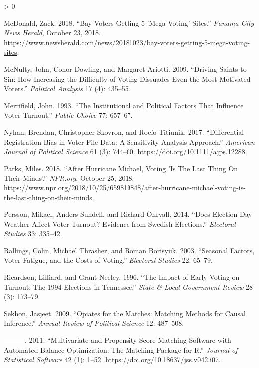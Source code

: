 \documentclass[
  12pt,
]{article}
\newlength{\cslhangindent}
\newenvironment{CSLReferences}[2] %
 {%
  \setlength{\parindent}{0pt}
  \ifodd #1 \everypar{\setlength{\hangindent}{\cslhangindent}}\ignorespaces\fi
  \ifnum #2 > 0
  \setlength{\parskip}{#2\baselineskip}
  \fi
 }%
 {}
\begin{document}
\begin{CSLReferences}{1}{0}
\leavevmode\hypertarget{ref-McDonald2018}{}%
McDonald, Zack. 2018. {``Bay Voters Getting 5 'Mega Voting' Sites.''} \emph{Panama City News Herald}, October 23, 2018. \url{https://www.newsherald.com/news/20181023/bay-voters-getting-5-mega-voting-sites}.

\leavevmode\hypertarget{ref-McNulty2009}{}%
McNulty, John, Conor Dowling, and Margaret Ariotti. 2009. {``Driving {Saints} to {Sin}: {How Increasing} the {Difficulty} of {Voting Dissuades Even} the {Most Motivated Voters}.''} \emph{Political Analysis} 17 (4): 435--55.

\leavevmode\hypertarget{ref-Merrifield1993}{}%
Merrifield, John. 1993. {``The {Institutional} and {Political Factors} That {Influence Voter Turnout}.''} \emph{Public Choice} 77: 657--67.

\leavevmode\hypertarget{ref-Nyhan2017}{}%
Nyhan, Brendan, Christopher Skovron, and Rocío Titiunik. 2017. {``Differential {Registration Bias} in {Voter File Data}: {A Sensitivity Analysis Approach}.''} \emph{American Journal of Political Science} 61 (3): 744--60. \url{https://doi.org/10.1111/ajps.12288}.

\leavevmode\hypertarget{ref-Parks2018}{}%
Parks, Miles. 2018. {``After {Hurricane Michael}, {Voting} '{Is The Last Thing On Their Minds}'.''} \emph{NPR.org}, October 25, 2018. \url{https://www.npr.org/2018/10/25/659819848/after-hurricane-michael-voting-is-the-last-thing-on-their-minds}.

\leavevmode\hypertarget{ref-Persson2014}{}%
Persson, Mikael, Anders Sundell, and Richard Öhrvall. 2014. {``Does {Election Day Weather Affect Voter Turnout}? {Evidence} from {Swedish Elections}.''} \emph{Electoral Studies} 33: 335--42.

\leavevmode\hypertarget{ref-Rallings2003}{}%
Rallings, Colin, Michael Thrasher, and Roman Borisyuk. 2003. {``Seasonal {Factors}, Voter Fatigue, and the Costs of Voting.''} \emph{Electoral Studies} 22: 65--79.

\leavevmode\hypertarget{ref-Ricardson1996}{}%
Ricardson, Lilliard, and Grant Neeley. 1996. {``The {Impact} of {Early Voting} on {Turnout}: {The} 1994 {Elections} in {Tennessee}.''} \emph{State \& Local Government Review} 28 (3): 173--79.

\leavevmode\hypertarget{ref-Sekhon2009}{}%
Sekhon, Jasjeet. 2009. {``Opiates for the {Matches}: {Matching Methods} for {Causal Inference}.''} \emph{Annual Review of Political Science} 12: 487--508.

\leavevmode\hypertarget{ref-Sekhon2011}{}%
---------. 2011. {``Multivariate and {Propensity Score Matching Software} with {Automated Balance Optimization}: {The Matching} Package for {R}.''} \emph{Journal of Statistical Software} 42 (1): 1--52. \url{https://doi.org/10.18637/jss.v042.i07}.


\end{CSLReferences}
\end{document}
